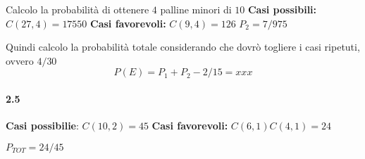 \documentclass{article}
\begin{document}
Calcolo la probabilità di ottenere $4$ palline minori di $10$
\textbf{Casi possibili:} $C(27,4)= 17550$
\textbf{Casi favorevoli:} $C(9,4) = 126$
$P_2=7/975$

Quindi calcolo la probabilità totale considerando che dovrò togliere i casi
ripetuti, ovvero $4/30$
\[P(E)=P_1+P_2-2/15=xxx\]


\paragraph{2.5}%
\label{par:2.5}
\textbf{Casi possibilie}: $C(10,2)= 45$
\textbf{Casi favorevoli:} $C(6,1) C(4,1)= 24$

$P_{TOT}=24/45$
\end{document}
